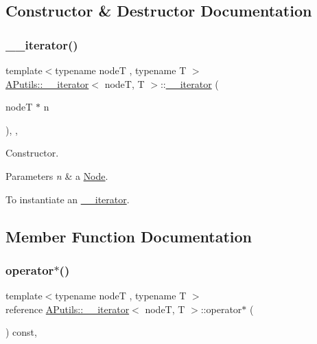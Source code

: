 \subsection{Constructor \& Destructor Documentation}
\mbox{\label{class_a_putils_1_1____iterator_a80b798b8b6922e66337873c614c32aeb}} 
\subsubsection{\texorpdfstring{\+\_\+\+\_\+iterator()}{\_\_iterator()}}
{\footnotesize\ttfamily template$<$typename nodeT , typename T $>$ \\
\hyperlink{class_a_putils_1_1____iterator}{A\+Putils\+::\+\_\+\+\_\+iterator}$<$ nodeT, T $>$\+::\hyperlink{class_a_putils_1_1____iterator}{\+\_\+\+\_\+iterator} (\begin{DoxyParamCaption}\item[{nodeT $\ast$}]{n }\end{DoxyParamCaption})\hspace{0.3cm}{\ttfamily [inline]}, {\ttfamily [explicit]}, {\ttfamily [noexcept]}}



Constructor. 


\begin{DoxyParams}{Parameters}
{\em n} & a {\ttfamily \hyperlink{struct_a_putils_1_1_node}{Node}}.\\
\hline
\end{DoxyParams}
To instantiate an {\ttfamily \hyperlink{class_a_putils_1_1____iterator}{\+\_\+\+\_\+iterator}}. 

\subsection{Member Function Documentation}
\mbox{\label{class_a_putils_1_1____iterator_a938d91cde92652266ae812ce9334b603}} 
\subsubsection{\texorpdfstring{operator$\ast$()}{operator*()}}
{\footnotesize\ttfamily template$<$typename nodeT , typename T $>$ \\
reference \hyperlink{class_a_putils_1_1____iterator}{A\+Putils\+::\+\_\+\+\_\+iterator}$<$ nodeT, T $>$\+::operator$\ast$ (\begin{DoxyParamCaption}{ }\end{DoxyParamCaption}) const\hspace{0.3cm}{\ttfamily [inline]}, {\ttfamily [noexcept]}}



